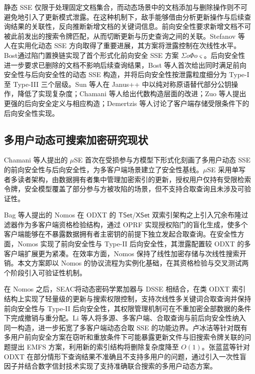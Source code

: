 静态 SSE 仅限于处理固定文档集合，而动态场景中的文档添加与删除操作则不可避免地引入了更新模式泄露。在这种机制下，敌手能够借由分析更新操作与后续查询结果的关联性，反向推断新增文档的关键词信息\cite{197239}。前向安全性要求新增文档不可被此前发出的搜索令牌匹配，从而切断更新与历史查询之间的关联。Stefanov 等人\cite{stefanov2014practical,10.1145/2382196.2382298,cash2014dynamic,6956592,10.1145/2660267.2660297}在实用化动态 SSE 方向取得了重要进展，其方案将泄露控制在次线性水平。Bost\cite{10.1145/2976749.2978303,10.1145/3133956.3133970}通过陷门置换链实现了首个形式化前向安全 SSE 方案 $\Sigma o\Phi o\varsigma$。后向安全性进一步要求已删除的文档不影响后续查询结果，Bost 等人\cite{10.1145/3133956.3133980}首次给出同时满足前向安全性与后向安全性的动态 SSE 构造，并将后向安全性按泄露粒度细分为 Type-I 至 Type-III 三个层级。Sun 等人\cite{10.1145/3243734.3243782}在 Janus++ 中以纯对称原语替代部分公钥操作，降低了实现复杂度；Chamani 等人\cite{10.1145/3243734.3243833}给出代数构造层面的改进；Zuo 等人\cite{10.1007/978-3-030-29962-0_14}提出更强的后向安全定义与相应构造；Demertzis 等人\cite{cryptoeprint:2019/1227}讨论了客户端存储受限条件下的后向安全性实现。

\subsection{多用户动态可搜索加密研究现状}

Chamani 等人\cite{cryptoeprint:2022/1114}提出的 $\mu$SE 首次在受损参与方模型下形式化刻画了多用户动态 SSE 的前向安全性与后向安全性，为多客户端场景建立了安全性基线。$\mu$SE 采用单写者多读者架构，由数据拥有者集中管理加密索引的更新，授权用户仅持有受限检索令牌，安全模型覆盖了部分参与方被攻陷的场景，但不支持合取查询且未涉及可验证性。

Bag 等人\cite{10.1145/3634737.3657018}提出的 Nomos 在 ODXT 的 $\mathsf{TSet}$/$\mathsf{XSet}$ 双索引架构之上引入冗余布隆过滤器作为多客户端资格检验结构，通过 OPRF 实现授权陷门的盲化生成，使多个客户端能够在不暴露数据拥有者主密钥的前提下独立发起合取查询。在安全性方面，Nomos 实现了前向安全性与 Type-II 后向安全性，其泄露配置较 ODXT 的多客户端扩展更为紧凑。在效率方面，Nomos 保持了线性加密存储与次线性搜索开销。本文方案即以 Nomos 的协议流程为实例化基础，在其资格检验与交叉测试两个阶段引入可验证性机制。

在 Nomos 之后，SEAC\cite{hu2025seac}将动态密码学累加器与 DSSE 相结合，在类 ODXT 索引结构上实现了轻量级的更新与搜索权限控制，支持次线性多关键词合取查询并保持前向安全性与 Type-II 后向安全性，其权限管理机制可在不重加密全部数据的条件下完成撤销与重分配。Li 等人\cite{11152498}将多源、多客户端、合取查询与前后向安全性纳入同一构造，进一步拓宽了多客户端动态合取 SSE 的功能边界。卢冰洁等\cite{JFYZ202010007}针对既有多用户前向安全方案在窃听和重放条件下可能暴露更新文件与旧搜索令牌关联的问题提出 EMFS 方案，利用新的索引结构将删除复杂度降至 $O(1)$。张蓝蓝等\cite{JFYZ202210013}针对 ODXT 在部分情形下查询结果不准确且不支持多用户的问题，通过引入一次性盲因子并结合数字信封技术实现了支持准确联合搜索的多用户动态方案。


